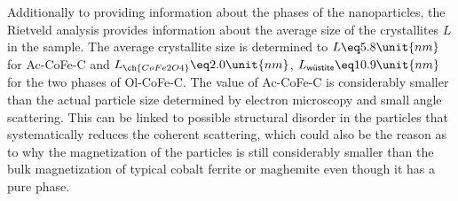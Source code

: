 \documentclass[\main/dresen_thesis.tex]{subfiles}
\begin{document}
    Additionally to providing information about the phases of the nanoparticles, the Rietveld analysis provides information about the average size of the crystallites $L$ in the sample.
    The average crystallite size is determined to $L \eq 5.8 \unit{nm}$ for Ac-CoFe-C and $L_{\ch{CoFe2O4}} \eq 2.0 \unit{nm}$, $L_{\textsf{w\"ustite}} \eq 10.9 \unit{nm}$ for the two phases of Ol-CoFe-C.
    The value of Ac-CoFe-C is considerably smaller than the actual particle size determined by electron microscopy and small angle scattering.
    This can be linked to possible structural disorder in the particles that systematically reduces the coherent scattering, which could also be the reason as to why the magnetization of the particles is still considerably smaller than the bulk magnetization of typical cobalt ferrite or maghemite even though it has a pure phase.
\end{document}
